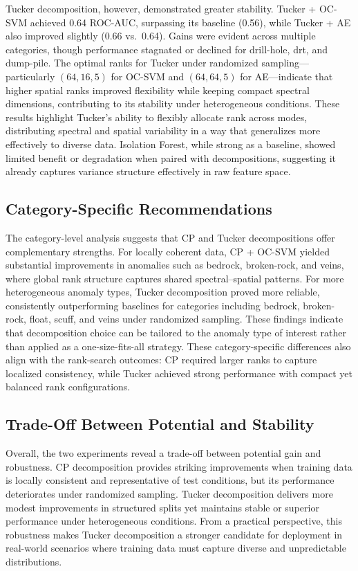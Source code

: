 \documentclass[11pt]{article}
\begin{document}
Tucker decomposition, however, demonstrated greater stability. Tucker + OC-SVM achieved 0.64 ROC-AUC, surpassing its baseline (0.56), while Tucker + AE also improved slightly (0.66 vs.\ 0.64). Gains were evident across multiple categories, though performance stagnated or declined for drill-hole, drt, and dump-pile. The optimal ranks for Tucker under randomized sampling—particularly \((64,16,5)\) for OC-SVM and \((64,64,5)\) for AE—indicate that higher spatial ranks improved flexibility while keeping compact spectral dimensions, contributing to its stability under heterogeneous conditions. These results highlight Tucker’s ability to flexibly allocate rank across modes, distributing spectral and spatial variability in a way that generalizes more effectively to diverse data. Isolation Forest, while strong as a baseline, showed limited benefit or degradation when paired with decompositions, suggesting it already captures variance structure effectively in raw feature space.  

\subsection{Category-Specific Recommendations}

The category-level analysis suggests that CP and Tucker decompositions offer complementary strengths. For locally coherent data, CP + OC-SVM yielded substantial improvements in anomalies such as bedrock, broken-rock, and veins, where global rank structure captures shared spectral–spatial patterns. For more heterogeneous anomaly types, Tucker decomposition proved more reliable, consistently outperforming baselines for categories including bedrock, broken-rock, float, scuff, and veins under randomized sampling. These findings indicate that decomposition choice can be tailored to the anomaly type of interest rather than applied as a one-size-fits-all strategy. These category-specific differences also align with the rank-search outcomes: CP required larger ranks to capture localized consistency, while Tucker achieved strong performance with compact yet balanced rank configurations.  

\subsection{Trade-Off Between Potential and Stability}

Overall, the two experiments reveal a trade-off between potential gain and robustness. CP decomposition provides striking improvements when training data is locally consistent and representative of test conditions, but its performance deteriorates under randomized sampling. Tucker decomposition delivers more modest improvements in structured splits yet maintains stable or superior performance under heterogeneous conditions. From a practical perspective, this robustness makes Tucker decomposition a stronger candidate for deployment in real-world scenarios where training data must capture diverse and unpredictable distributions.  
\end{document}
